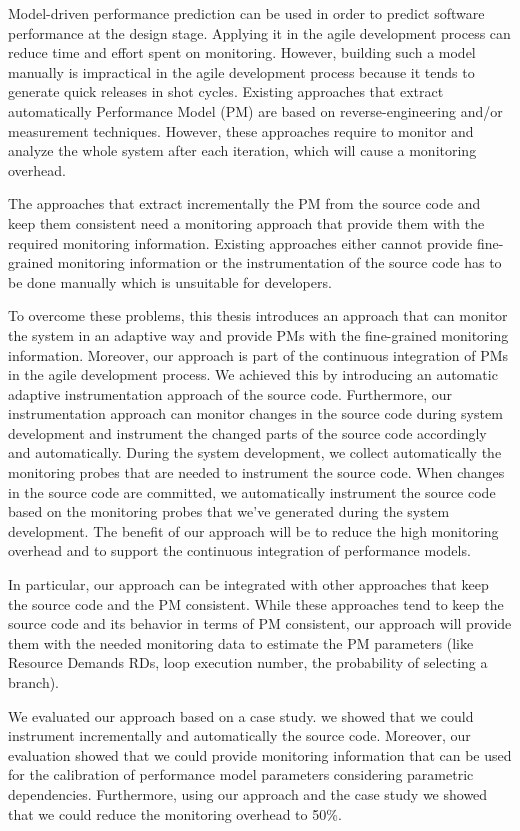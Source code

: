
\Abstract
Model-driven performance prediction can be used in order to predict software performance at the design stage. Applying it in the agile development process can reduce time and effort spent on monitoring. However, building such a model manually is impractical in the agile development process because it tends to generate quick releases in shot cycles. Existing approaches that extract automatically Performance Model (PM) are based on reverse-engineering and/or measurement techniques. However, these approaches require to monitor and analyze the whole system after each iteration, which will cause a monitoring overhead. 

The approaches that extract incrementally the PM from the source code and keep them consistent need a monitoring approach that provide them with the required monitoring information. Existing approaches either cannot provide fine-grained monitoring information or the instrumentation of the source code has to be done manually which is unsuitable for developers.

To overcome these problems, this thesis introduces an approach that can monitor the system in an adaptive way and provide PMs with the fine-grained monitoring information. Moreover, our approach is part of the continuous integration of PMs in the agile development process. We achieved this by introducing an automatic adaptive instrumentation approach of the source code. Furthermore, our instrumentation approach can monitor changes in the source code during system development and instrument the changed parts of the source code accordingly and automatically. During the system development, we collect automatically the monitoring probes that are needed to instrument the source code. When changes in the source code are committed, we automatically instrument the source code based on the monitoring probes that we've generated during the system development. The benefit of our approach will be to reduce the high monitoring overhead and to support the continuous integration of performance models.  

In particular, our approach can be integrated with other approaches that keep the source code and the PM consistent. While these approaches tend to keep the source code and its behavior in terms of PM consistent, our approach will provide them with the needed monitoring data to estimate the PM parameters (like Resource Demands RDs, loop execution number, the probability of selecting a branch).  

We evaluated our approach based on a case study. we showed that we could instrument incrementally and automatically the source code. Moreover, our evaluation showed that we could provide monitoring information that can be used for the calibration of performance model parameters considering parametric dependencies. Furthermore, using our approach and the case study we showed that we could reduce the monitoring overhead to 50\%. 